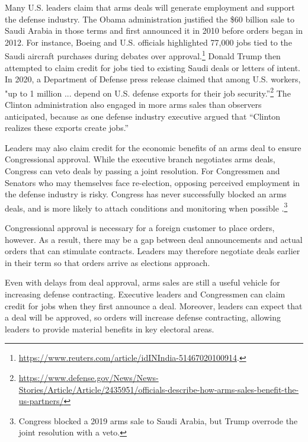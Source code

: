 \documentclass[12pt]{article}
\begin{document}
Many U.S. leaders claim that arms deals will generate employment and support the defense industry. 
The Obama administration justified the \$60 billion sale to Saudi Arabia in those terms and first announced it in 2010 before orders began in 2012.
For instance, Boeing and U.S. officials highlighted 77,000 jobs tied to the Saudi aircraft purchases during debates over approval.\footnote{\url{https://www.reuters.com/article/idINIndia-51467020100914}.}
Donald Trump then attempted to claim credit for jobs tied to existing Saudi deals or letters of intent. 
In 2020, a Department of Defense press release claimed that among U.S. workers, "up to 1 million ... depend on U.S. defense exports for their job security.''\footnote{\url{https://www.defense.gov/News/News-Stories/Article/Article/2435951/officials-describe-how-arms-sales-benefit-the-us-partners/}}
The Clinton administration also engaged in more arms sales than observers anticipated, because as one defense industry executive argued that ``Clinton realizes these exports create jobs.''%


Leaders may also claim credit for the economic benefits of an arms deal to ensure Congressional approval. 
While the executive branch negotiates arms deals, Congress can veto deals by passing a joint resolution. 
For Congressmen and Senators who may themselves face re-election, opposing perceived employment in the defense industry is risky.
Congress has never successfully blocked an arms deals, and is more likely to attach conditions and monitoring when possible \citep{Thralletal2020}.\footnote{Congress blocked a 2019 arms sale to Saudi Arabia, but Trump overrode the joint resolution with a veto.}


Congressional approval is necessary for a foreign customer to place orders, however. 
As a result, there may be a gap between deal announcements and actual orders that can stimulate contracts.
Leaders may therefore negotiate deals earlier in their term so that orders arrive as elections approach.  


Even with delays from deal approval, arms sales are still a useful vehicle for increasing defense contracting. 
Executive leaders and Congressmen can claim credit for jobs when they first announce a deal. 
Moreover, leaders can expect that a deal will be approved, so orders will increase defense contracting, allowing leaders to provide material benefits in key electoral areas. 
\end{document}
